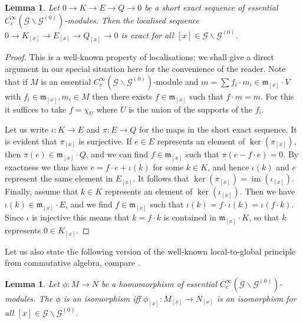 \documentclass{amsart}
\newtheorem{lemma}[thm]{Lemma}
\newcommand{\G}{\mathcal{G}}
\newcommand{\ccinfty}{C_c^\infty}
\DeclareMathOperator{\im}{im}
\begin{document}
\begin{lemma} \label{localisationexact}
Let $ 0 \rightarrow K \rightarrow E \rightarrow Q \rightarrow 0 $ be a short exact sequence of essential $ \ccinfty(\G \backslash \G^{(0)}) $-modules. Then the localised sequence $ 0 \rightarrow K_{[x]} \rightarrow E_{[x]} \rightarrow Q_{[x]} \rightarrow 0 $ is exact for all $ [x] \in \G \backslash \G^{(0)}$. 
\end{lemma}

\begin{proof}
This is a well-known property of localisations; we shall give a direct argument in our special situation here for the convenience of the reader. Note that if $ M $ is an essential $ \ccinfty(\G \backslash \G^{(0)}) $-module and $ m = \sum f_i \cdot m_i \in \mathfrak{m}_{[x]} \cdot V $ with $ f_i \in \mathfrak{m}_{[x]}, m_i \in M $ then there exists $ f \in \mathfrak{m}_{[x]} $ such that $ f \cdot m = m $. For this it suffices to take $ f = \chi_U $ where $ U $ is the union of the supports of the $ f_i $.  

Let us write $ \iota: K \rightarrow E $ and $ \pi: E \rightarrow Q $ for the maps in the short exact sequence. It is evident that $ \pi_{[x]} $ is surjective. If $ e \in E $ represents an element of $ \ker(\pi_{[x]}) $, then $ \pi(e) \in \mathfrak{m}_{[x]} \cdot Q $, 
and we can find $ f \in \mathfrak{m}_{[x]} $ such that $ \pi(e - f \cdot e) = 0 $. 
By exactness we thus have $ e = f \cdot e + \iota(k) $ for some $ k \in K $, and hence $ \iota(k) $ and $ e $ represent the same element in $ E_{[x]} $. It follows that $ \ker(\pi_{[x]}) = \im(\iota_{[x]}) $. Finally, assume that $ k \in K $ represents an element of  $ \ker(\iota_{[x]}) $. Then we have $ \iota(k) \in \mathfrak{m}_{[x]} \cdot E $, and we find $ f \in \mathfrak{m}_{[x]} $ such that $ \iota(k) = f \cdot \iota(k) = \iota(f \cdot k) $. Since $ \iota $ is injective this means that $ k = f \cdot k $ is contained in $ \mathfrak{m}_{[x]} \cdot K $, so that $ k $ represents $ 0 \in K_{[x]} $. 
\end{proof}

Let us also state the following version of the well-known local-to-global principle from commutative algebra, compare \cite[Chapter 3]{ATIYAH_MACDONALD_commutativealgebra}. 

\begin{lemma} \label{localtoglobal}
Let $ \phi: M \rightarrow N $ be a homomorphism of essential $ \ccinfty(\G \backslash \G^{(0)}) $-modules. The $ \phi $ is an isomorphism iff $ \phi_{[x]}: M_{[x]} \rightarrow N_{[x]} $ is an isomorphism for all $ [x] \in \G \backslash \G^{(0)} $. 
\end{lemma} 
\end{document}
